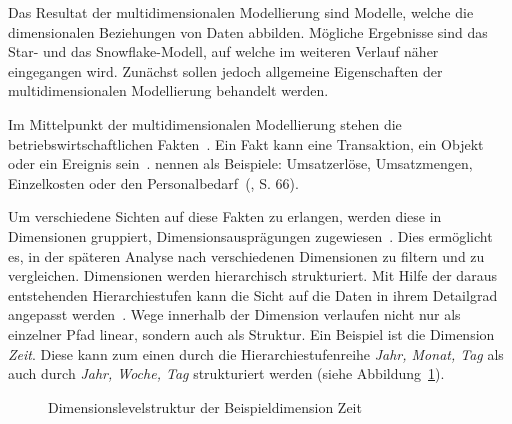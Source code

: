 \documentclass[
  language=german, %
  type=bachelor,%
  ngerman
]{isthesis}
\begin{document}
\begin{content}
  Das Resultat der multidimensionalen Modellierung sind Modelle, welche die
  dimensionalen Beziehungen von Daten abbilden. Mögliche Ergebnisse sind das
  Star- und das Snowflake-Modell, auf welche im weiteren Verlauf näher
  eingegangen wird. Zunächst sollen jedoch allgemeine Eigenschaften der
  multidimensionalen Modellierung behandelt werden.

  Im Mittelpunkt der multidimensionalen Modellierung stehen die
  betriebswirtschaftlichen Fakten~\cite[][S.  2]{phipps2002automating}. Ein
  Fakt kann eine Transaktion, ein Objekt oder ein Ereignis sein~\cite[][S.
  42]{ballard1998data}. \textsc{\citeauthor{Kemper2010}} nennen als Beispiele:
  \glqq{}Umsatzerlöse, Umsatzmengen, Einzelkosten oder den
  Personalbedarf\grqq{}~(\citeyear{Kemper2010}, S. 66). 

  Um verschiedene Sichten auf diese Fakten zu erlangen, werden diese in Dimensionen gruppiert, \bzw{} Dimensionsausprägungen zugewiesen~\cite[][S.
  66]{Kemper2010}. Dies ermöglicht es, in der späteren Analyse nach
  verschiedenen Dimensionen zu filtern und zu vergleichen. Dimensionen werden
  hierarchisch strukturiert. Mit Hilfe der daraus entstehenden Hierarchiestufen
  kann die Sicht auf die Daten in ihrem Detailgrad angepasst werden~\cite[][S.
  66]{Kemper2010}. Wege innerhalb der Dimension verlaufen nicht nur als
  einzelner Pfad linear, sondern auch als Struktur. Ein Beispiel ist die
  Dimension \textit{Zeit}.  Diese kann zum einen durch die
  Hierarchiestufenreihe \textit{Jahr, Monat, Tag} als auch durch \textit{Jahr,
  Woche, Tag} strukturiert werden (siehe
  Abbildung~\ref{hierarchie-level-struktur}).

  \begin{figure}
    \resizebox{100pt}{!}{}
    \caption{Dimensionslevelstruktur der Beispieldimension Zeit}\label{hierarchie-level-struktur}
  \end{figure}


\end{content}
\end{document}
